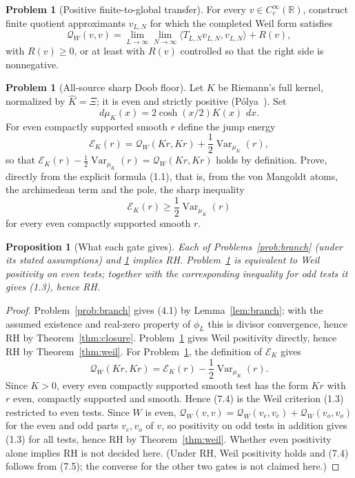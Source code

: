 \documentclass[11pt]{amsart}
\newtheorem{proposition}[theorem]{Proposition}
\theoremstyle{definition}
\newtheorem{problem}[theorem]{Problem}
\theoremstyle{remark}
\newcommand{\R}{\mathbb R}
\newcommand{\dd}{\,d}
\newcommand{\QW}{\mathcal Q_W}
\newcommand{\XiR}{\Xi}
\DeclareMathOperator{\Var}{Var}
\begin{document}
\begin{problem}[Positive finite-to-global transfer]
\label{prob:transfer}
For every \(v\in C_c^\infty(\R)\), construct finite quotient approximants
\(v_{L,N}\) for which the completed Weil form satisfies
\[
 \QW(v,v)
 =
 \lim_{L\to\infty}\lim_{N\to\infty}
 \langle T_{L,N}v_{L,N},v_{L,N}\rangle
 +
 R(v),
\tag{7.2}
\]
with \(R(v)\ge0\), or at least with \(R(v)\) controlled so that the right
side is nonnegative.
\end{problem}

\begin{problem}[All-source sharp Doob floor]
\label{prob:doob}
Let \(K\) be Riemann's full kernel, normalized by
\(\widehat K=\XiR\); it is even and strictly positive
(P\'olya~\cite{Polya1926}).  Set
\[
 d\mu_K(x)=2\cosh(x/2)K(x)\,\dd x .
\tag{7.3}
\]
For even compactly supported smooth \(r\) define the jump energy
\[
 \mathscr E_K(r)=\QW(Kr,Kr)+\frac12\Var_{\mu_K}(r),
\]
so that \(\mathscr E_K(r)-\frac12\Var_{\mu_K}(r)=\QW(Kr,Kr)\) holds by
definition.  Prove, directly from the explicit formula (1.1), that is,
from the von Mangoldt atoms, the archimedean term and the pole, the sharp
inequality
\[
 \boxed{
 \mathscr E_K(r)\ge\frac12\Var_{\mu_K}(r)}
\tag{7.4}
\]
for every even compactly supported smooth \(r\).
\end{problem}

\begin{proposition}[What each gate gives]
Each of Problems~\ref{prob:branch} (under its stated assumptions) and
\ref{prob:transfer} implies RH.  Problem~\ref{prob:doob} is equivalent to
Weil positivity on even tests; together with the corresponding inequality
for odd tests it gives (1.3), hence RH.
\end{proposition}

\begin{proof}
Problem~\ref{prob:branch} gives (4.1) by Lemma~\ref{lem:branch}; with
the assumed existence and real-zero property of \(\phi_L\) this is
divisor convergence, hence RH by Theorem~\ref{thm:closure}.
Problem~\ref{prob:transfer} gives Weil positivity directly, hence RH by
Theorem~\ref{thm:weil}.  For Problem~\ref{prob:doob}, the definition of
\(\mathscr E_K\) gives
\[
 \QW(Kr,Kr)=\mathscr E_K(r)-\frac12\Var_{\mu_K}(r).
\tag{7.5}
\]
Since \(K>0\), every even compactly supported smooth test has the form
\(Kr\) with \(r\) even, compactly supported and smooth.  Hence (7.4)
is the Weil criterion (1.3) restricted to even tests.  Since \(W\) is
even, \(\QW(v,v)=\QW(v_e,v_e)+\QW(v_o,v_o)\) for the even and odd parts
\(v_e,v_o\) of \(v\), so positivity on odd tests in addition gives (1.3)
for all tests, hence RH by Theorem~\ref{thm:weil}.  Whether even
positivity alone implies RH is not decided here.  (Under RH, Weil
positivity holds and (7.4) follows from (7.5); the converse for the other
two gates is not claimed here.)
\end{proof}
\end{document}

